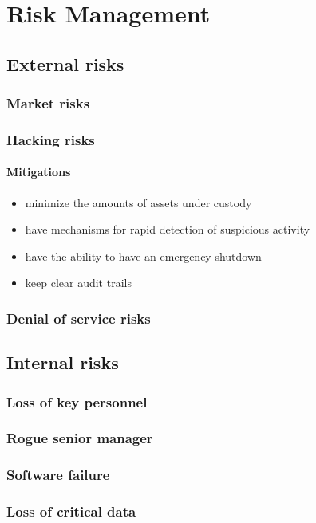 \chapter{Risk Management}

\section{External risks}
\subsection{Market risks}
\subsection{Hacking risks}
\subsubsection{Mitigations}
\begin{itemize}
\item minimize the amounts of assets under custody
\item have mechanisms for rapid detection of suspicious activity
\item have the ability to have an emergency shutdown
  \item keep clear audit trails
  \end{itemize}
\subsection{Denial of service risks}
\section{Internal risks}
\subsection{Loss of key personnel}
\subsection{Rogue senior manager}
\subsection{Software failure}
\subsection{Loss of critical data}

